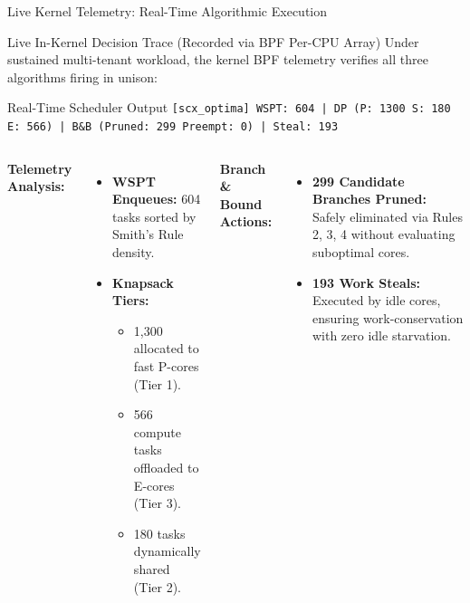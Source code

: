 \documentclass{beamer}
\begin{document}
\begin{frame}[fragile]{Live Kernel Telemetry: Real-Time Algorithmic Execution}
  \begin{block}{Live In-Kernel Decision Trace (Recorded via BPF Per-CPU Array)}
    \footnotesize
    Under sustained multi-tenant workload, the kernel BPF telemetry verifies all three algorithms firing in unison:
  \end{block}

  \vspace{0.15cm}
  \begin{exampleblock}{\small Real-Time Scheduler Output}
    \fontsize{7pt}{8.5pt}\selectfont
    \texttt{[scx\_optima] WSPT: 604 | DP (P: 1300 S: 180 E: 566) | B\&B (Pruned: 299 Preempt: 0) | Steal: 193}
  \end{exampleblock}

  \vspace{0.15cm}
  \begin{columns}[T]
      \textbf{Telemetry Analysis:}
      \begin{itemize}\itemsep2pt\tiny
        \item \textbf{WSPT Enqueues:} 604 tasks sorted by Smith's Rule density.
        \item \textbf{Knapsack Tiers:}
              \begin{itemize}\tiny
                \item 1,300 allocated to fast P-cores (Tier 1).
                \item 566 compute tasks offloaded to E-cores (Tier 3).
                \item 180 tasks dynamically shared (Tier 2).
              \end{itemize}
      \end{itemize}

      \textbf{Branch \& Bound Actions:}
      \begin{itemize}\itemsep2pt\tiny
        \item \textbf{299 Candidate Branches Pruned:} Safely eliminated via Rules 2, 3, 4 without evaluating suboptimal cores.
        \item \textbf{193 Work Steals:} Executed by idle cores, ensuring work-conservation with zero idle starvation.
      \end{itemize}
  \end{columns}
\end{frame}

\end{document}
